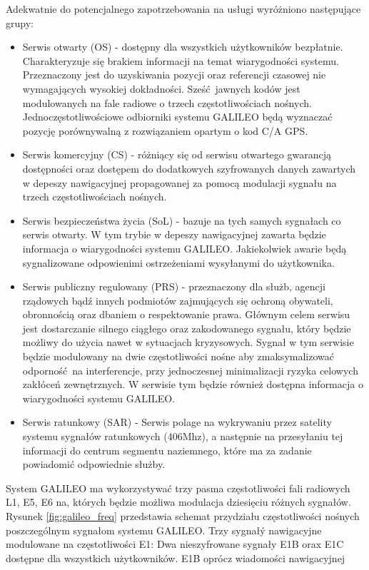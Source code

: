 Adekwatnie do potencjalnego zapotrzebowania na usługi wyróżniono następujące grupy:
\begin{itemize}
\item Serwis otwarty (OS) - dostępny dla wszystkich użytkowników bezpłatnie. Charakteryzuje się brakiem informacji na temat wiarygodności systemu.
Przeznaczony jest do uzyskiwania pozycji oraz referencji czasowej nie wymagających wysokiej dokładności. Sześć jawnych kodów jest modulowanych na fale radiowe o 
trzech częstotliwościach nośnych. Jednoczęstotliwościowe odbiorniki systemu GALILEO będą wyznaczać pozycję porównywalną z rozwiązaniem opartym o kod C/A GPS.
\item Serwis komercyjny (CS) - różniący się od serwisu otwartego gwarancją dostępności oraz dostępem do dodatkowych szyfrowanych danych zawartych w depeszy nawigacyjnej 
propagowanej za pomocą modulacji sygnału na trzech częstotliwościach nośnych. 
\item Serwis bezpieczeństwa życia (SoL) - bazuje na tych samych sygnałach co serwis otwarty. W tym trybie w depeszy nawigacyjnej zawarta będzie informacja o wiarygodności 
systemu GALILEO. Jakiekolwiek awarie będą sygnalizowane odpowienimi ostrzeżeniami wysyłanymi do użytkownika.
\item Serwis publiczny regulowany (PRS) - przeznaczony dla służb, agencji rządowych bądź innych podmiotów zajmujących się ochroną obywateli, obronnością oraz dbaniem o
respektowanie prawa. Głównym celem serwisu jest dostarczanie silnego ciągłego oraz zakodowanego sygnału, który będzie możliwy do użycia nawet w sytuacjach kryzysowych.
Sygnał w tym serwisie będzie modulowany na dwie częstotliwości nośne aby zmaksymalizować odporność na interferencje, przy jednoczesnej minimalizacji ryzyka celowych
zakłóceń zewnętrznych. W serwisie tym będzie również dostępna informacja o wiarygodności systemu GALILEO.
\item Serwis ratunkowy (SAR) - Serwis polage na wykrywaniu przez satelity systemu sygnałów ratunkowych (406Mhz), a następnie na przesyłaniu tej informacji do 
centrum segmentu naziemnego, które ma za zadanie powiadomić odpowiednie służby.
\end{itemize}
\indent System GALILEO ma wykorzystywać trzy pasma częstotliwości fali radiowych L1, E5, E6 na, których będzie możliwa modulacja dziesięciu różnych sygnałów.
Rysunek \ref{fig:galileo_freq} przedstawia schemat przydziału częstotliwości nośnych poszczególnym sygnałom systemu GALILEO.
Trzy sygnałý nawigacyjne modulowane na częstotliwości E1: Dwa nieszyfrowane sygnały E1B orax E1C dostępne dla wszystkich użytkowników. E1B oprócz wiadomości nawigacyjnej 
